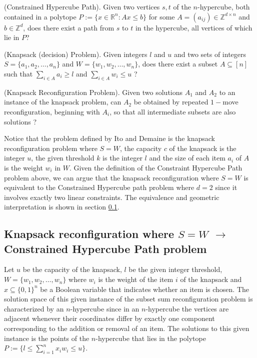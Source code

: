 \begin{defn}{(Constrained Hypercube Path).} Given two vertices $s, t$ of the $n$-hypercube, both contained in a polytope
$P := \{x \in \mathbb{R}^n : Ax \leq b\}$ for some $A = (a_{ij}) \in \mathbb{Z}^{d \times n}$ and $b \in \mathbb{Z}^d$, does there exist a path from $s$ to $t$
in the hypercube, all vertices of which lie in $P$?
\end{defn}

\begin{defn}{(Knapsack (decision) Problem).} Given integers $l$ and $u$ and two sets of integers $S = \{a_1, a_2,\dots, a_n\}$ and $W = \{w_1, w_2,\dots, w_n\}$,
does there exist a subset $A \subseteq [ n ]$ such that $\sum_{i \in A}a_i \geq l$ and $\sum_{i \in A} w_i \leq u$ ?
\end{defn}

\begin{defn}{(Knapsack Reconfiguration Problem).} Given two solutions $A_1$ and $A_2$ to an instance of the knapsack problem, can $A_2$ be obtained
by repeated $1-$move reconfiguration, beginning with $A_i$, so that all intermediate subsets are also solutions ?
\end{defn}

Notice that the problem defined by Ito and Demaine is the knapsack reconfiguration problem where $S = W$, the capacity $c$ of the
knapsack is the integer $u$, the given threshold $k$ is the integer $l$ and the size of each item $a_i$ of $A$ is the weight $w_i$ in $W$.
Given the definition of the Constraint Hypercube Path problem above, we can argue that the knapsack reconfiguration where $S = W$ is equivalent to
the Constrained Hypercube path problem where $d = 2$ since it involves exactly two linear constraints. The equivalence and geometric interpretation
is shown in section \ref{subsection:knapsack-reconf}.


\subsection{Knapsack reconfiguration where $S = W$ $\rightarrow$ Constrained Hypercube Path problem} \label{subsection:knapsack-reconf}

Let $u$ be the capacity of the knapsack, $l$ be the given integer threshold, $W = \{w_1, w_2, \dots, w_n\}$ where $w_i$ is the weight of the item $i$
of the knapsack and $x \subseteq \{0,1\}^{n}$ be a Boolean variable that indicates whether an item is chosen. The solution space of this given instance of the subset sum reconfiguration problem
is characterized by an $n$-hypercube since in an $n$-hypercube the vertices are adjacent whenever their
coordinates differ by exactly one component corresponding to the addition or removal of an item. The solutions to this given instance is the
points of the $n$-hypercube that lies in the polytope  $P := \{l \leq \sum_{i=1}^{n} x_{i}w_{i} \leq u\}$.


